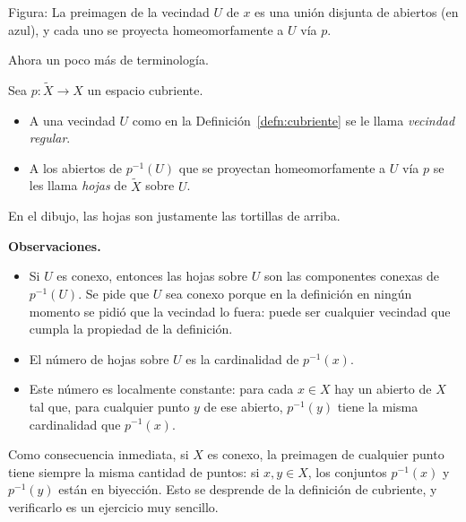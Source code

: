 \documentclass[11pt]{article}
\begin{document}
\begin{center}
\end{center}

\noindent Figura: La preimagen de la vecindad $U$ de $x$ es una unión disjunta de abiertos (en azul), y cada uno se proyecta homeomorfamente a $U$ vía $p$.

\medskip
Ahora un poco más de terminología.

\begin{defn}\label{defn:hojas}
Sea $p\colon\tilde X\to X$ un espacio cubriente.
\begin{itemize}
  \item A una vecindad $U$ como en la Definición~\ref{defn:cubriente} se le llama \emph{vecindad regular}.
  \item A los abiertos de $p^{-1}(U)$ que se proyectan homeomorfamente a $U$ vía $p$ se les llama \emph{hojas} de $\tilde X$ sobre $U$.
\end{itemize}
\end{defn}

En el dibujo, las hojas son justamente las tortillas de arriba.

\medskip\noindent\textbf{Observaciones.}
\begin{itemize}
  \item Si $U$ es conexo, entonces las hojas sobre $U$ son las componentes conexas de $p^{-1}(U)$. Se pide que $U$ sea conexo porque en la definición en ningún momento se pidió que la vecindad lo fuera: puede ser cualquier vecindad que cumpla la propiedad de la definición.
  \item El número de hojas sobre $U$ es la cardinalidad de $p^{-1}(x)$.
  \item Este número es localmente constante: para cada $x\in X$ hay un abierto de $X$ tal que, para cualquier punto $y$ de ese abierto, $p^{-1}(y)$ tiene la misma cardinalidad que $p^{-1}(x)$.
\end{itemize}
Como consecuencia inmediata, si $X$ es conexo, la preimagen de cualquier punto tiene siempre la misma cantidad de puntos: si $x,y\in X$, los conjuntos $p^{-1}(x)$ y $p^{-1}(y)$ están en biyección. Esto se desprende de la definición de cubriente, y verificarlo es un ejercicio muy sencillo.
\end{document}
